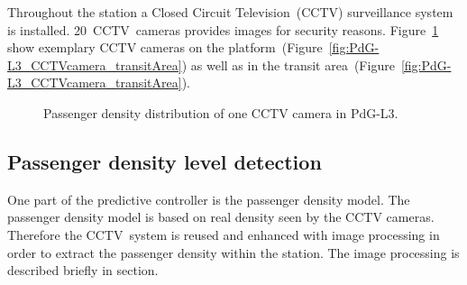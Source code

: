 Throughout the station a Closed Circuit Television~(CCTV) surveillance system is installed. 20~CCTV~cameras provides images for security reasons. Figure~\ref{fig:PdG-L3_CCTVcameras} show exemplary CCTV cameras on the platform~(Figure~\ref{fig:PdG-L3_CCTVcamera_transitArea}) as well as in the transit area~(Figure~\ref{fig:PdG-L3_CCTVcamera_transitArea}).

\begin{figure}[htbp]

  \centering

  \hfill

  \caption{Passenger density distribution of one CCTV camera in PdG-L3.}
  \label{fig:PdG-L3_CCTVcameras}

\end{figure}


\subsection{Passenger density level detection}
\label{subsec:PassengerDensityLevelDetection}

One part of the predictive controller is the passenger density model. The passenger density model is based on real density seen by the CCTV cameras. Therefore the CCTV~system is reused and enhanced with image processing in order to extract the passenger density within the station. The image processing is described briefly in section.

